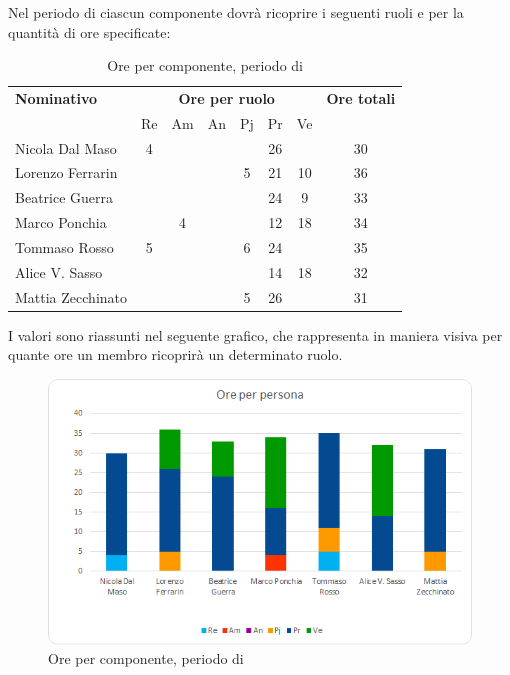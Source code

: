 \subsubsection{\Cod}
Nel periodo di \Cod{} ciascun componente dovrà ricoprire i seguenti ruoli e per la quantità di ore specificate:

\begin{table}[H]
	\centering
	\begin{tabular}{|l|c|c|c|c|c|c|c|}
		\hline
		\textbf{Nominativo} & 
		\multicolumn{6}{c|}{\textbf{Ore per ruolo}} & 
		\textbf{Ore totali} \\
		& Re & Am & An & Pj & Pr & Ve & \\
		\hline
		Nicola Dal Maso &4 & & & &26 & & 30 \\
		Lorenzo Ferrarin & & & &5 &21 &10 & 36 \\
		Beatrice Guerra & & & & &24 &9 & 33 \\
		Marco Ponchia & &4 & & &12 &18 & 34 \\
		Tommaso Rosso &5 & & &6 &24 & & 35 \\
		Alice V. Sasso & & & & &14 &18 & 32 \\
		Mattia Zecchinato & & & &5 &26 & & 31 \\
		\hline
	\end{tabular}
	\caption{Ore per componente, periodo di \Cod{}}
\end{table}
I valori sono riassunti nel seguente grafico, che rappresenta in maniera visiva per quante ore un membro ricoprirà un determinato ruolo.
\begin{figure}[H]
	\centering
	\includegraphics[width=14cm]{img_suddlavoro/C2.png}
	\caption{Ore per componente, periodo di \Cod{}}
\end{figure}

